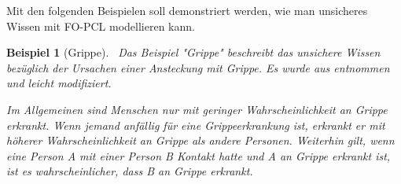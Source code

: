 \documentclass[a4paper, 11pt]{book}
\newtheorem{Bsp}{Beispiel}[section]
\begin{document}
Mit den folgenden Beispielen soll demonstriert werden, wie man unsicheres Wissen mit FO-PCL modellieren kann.

\begin{Bsp}[Grippe]\label{sec:Bsp1}\
Das Beispiel "{}Grippe"{} beschreibt das unsichere Wissen bezüglich der Ursachen einer Ansteckung mit Grippe. Es wurde aus \cite[Bsp. 6.2.7, S. 128/129]{Fis10} entnommen und leicht modifiziert.

Im Allgemeinen sind Menschen nur mit geringer Wahrscheinlichkeit an Grippe erkrankt. Wenn jemand anfällig für eine Grippeerkrankung ist, erkrankt er mit höherer Wahrscheinlichkeit an Grippe als andere Personen. Weiterhin gilt, wenn eine Person A mit einer Person B Kontakt hatte und A an Grippe erkrankt ist, ist es wahrscheinlicher, dass B an Grippe erkrankt. 


\end{Bsp}
\end{document}
